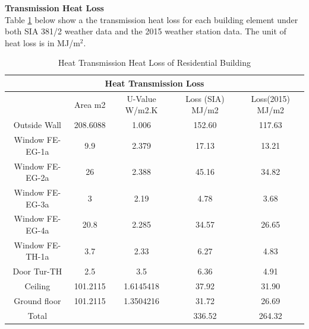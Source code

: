 \documentclass[a4paper, oneside]{discothesis}
\begin{document}
		\textbf{Transmission Heat Loss}\\
		Table \ref{tab:HonggTransmission} below show a the transmission heat loss for each building element under both SIA 381/2 weather data and the 2015 weather station data. The unit of heat loss is in MJ/m$^2$.
		\begin{table}[htbp]
		\small
		\centering
		\caption{Heat Transmission Heat Loss of Residential Building}
		    \begin{tabular}{|ccccc|}
		    \toprule
		    \multicolumn{5}{|c|}{\textbf{Heat Transmission Loss}} \\
		    \midrule
		          & \multicolumn{1}{p{4.785em}}{Area m2} & \multicolumn{1}{p{4.785em}}{U-Value W/m2.K} & \multicolumn{1}{p{5.715em}}{Loss (SIA) MJ/m2} & \multicolumn{1}{p{5.715em}|}{Loss(2015) MJ/m2} \\
		    \midrule
		    Outside Wall & 208.6088 & 1.006 & 152.60 & 117.63 \\
		    Window FE-EG-1a & 9.9   & 2.379 & 17.13 & 13.21 \\
		    Window FE-EG-2a & 26    & 2.388 & 45.16 & 34.82 \\
		    Window FE-EG-3a & 3     & 2.19  & 4.78  & 3.68 \\
		    Window FE-EG-4a & 20.8  & 2.285 & 34.57 & 26.65 \\
		    Window FE-TH-1a & 3.7   & 2.33  & 6.27  & 4.83 \\
		    Door Tur-TH & 2.5   & 3.5   & 6.36  & 4.91 \\
		    Ceiling & 101.2115 & 1.6145418 & 37.92 & 31.90 \\
		    Ground floor & 101.2115 & 1.3504216 & 31.72 & 26.69 \\
		    \midrule
		    Total &       &       & 336.52 & 264.32 \\
		    \bottomrule
		    \end{tabular}%
		  \label{tab:HonggTransmission}%
		\end{table}%
\end{document}
